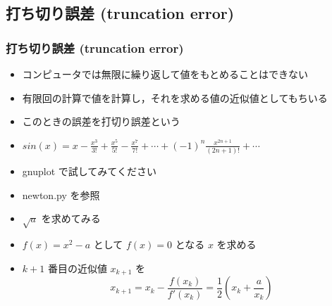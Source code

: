 \subsection{打ち切り誤差 (truncation error)}
\begin{frame}[shrink]\label{sl:back}
\frametitle{打ち切り誤差 (truncation error)}
  \begin{itemize}
\item コンピュータでは無限に繰り返して値をもとめることはできない
\item 有限回の計算で値を計算し，それを求める値の近似値としてもちいる
\item このときの誤差を打切り誤差という
  \end{itemize}
  \begin{example}
    \begin{itemize}
\item \(sin(x)=x-\frac{x^3}{3!}+\frac{x^5}{5!}-\frac{x^7}{7!}+\cdots+(-1)^{n}\frac{x^{2n+1}}{(2n+1)!}+\cdots\)
\item gnuplot で試してみてください
    \end{itemize}
  \end{example}
  \begin{example}[平方根の計算]
    \begin{itemize}
\item newton.py を参照\hyperlink{newton-is_enough-rec}{}
\item \(\sqrt{a}\) を求めてみる
\item \(f(x)=x^2-a\) として \(f(x)=0\) となる $x$ を求める
\item \(k+1\) 番目の近似値 \(x_{k+1}\) を
      \begin{displaymath}
x_{k+1} = x_k-\frac{f(x_k)}{f'(x_k)} = \frac{1}{2}(x_k+\frac{a}{x_k})
      \end{displaymath}
    \end{itemize}
  \end{example}
\end{frame}
